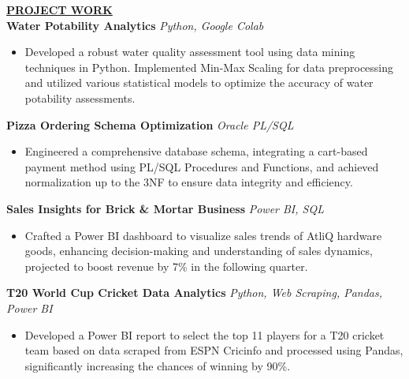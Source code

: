 \documentclass{article}
\begin{document}
%
%


\noindent \textbf{\underline{PROJECT WORK}} \\
\noindent \textbf{Water Potability Analytics} \textit{Python, Google Colab} \hfill \textbf{}
\begin{itemize}[noitemsep,nolistsep,leftmargin=*]
\item {\small Developed a robust water quality assessment tool using data mining techniques in Python. Implemented Min-Max Scaling for data preprocessing and utilized various statistical models to optimize the accuracy of water potability assessments.}
\end{itemize}

\noindent \textbf{Pizza Ordering Schema Optimization} \textit{Oracle PL/SQL} \hfill \textbf{}
\begin{itemize}[noitemsep,nolistsep,leftmargin=*]
\item {\small Engineered a comprehensive database schema, integrating a cart-based payment method using PL/SQL Procedures and Functions, and achieved normalization up to the 3NF to ensure data integrity and efficiency.}
\end{itemize}

\noindent \textbf{Sales Insights for Brick \& Mortar Business} \textit{Power BI, SQL} \hfill \textbf{}
\begin{itemize}[noitemsep,nolistsep,leftmargin=*]
\item {\small Crafted a Power BI dashboard to visualize sales trends of AtliQ hardware goods, enhancing decision-making and understanding of sales dynamics, projected to boost revenue by 7\% in the following quarter.}
\end{itemize}

\noindent \textbf{T20 World Cup Cricket Data Analytics} \textit{Python, Web Scraping, Pandas, Power BI} \hfill \textbf{}
\begin{itemize}[noitemsep,nolistsep,leftmargin=*]
\item {\small Developed a Power BI report to select the top 11 players for a T20 cricket team based on data scraped from ESPN Cricinfo and processed using Pandas, significantly increasing the chances of winning by 90\%.}
\end{itemize}
\end{document}

